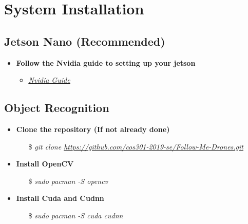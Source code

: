 \chapter{System Installation}

\section{Jetson Nano (Recommended)}
\begin{itemize}
    \item \textbf{Follow the Nvidia guide to setting up your jetson}
        \begin{itemize}
            \item \href{https://developer.nvidia.com/embedded/learn/get-started-jetson-nano-devkit}{\textit{\underline{Nvidia Guide}}} \cite{NvidiaJetson}
        \end{itemize}
\end{itemize}

\section{Object Recognition}
\begin{itemize}
    \item \textbf{Clone the repository (If not already done)}
        \begin{itemize}
            \item[\$] \textit{git clone \url{https://github.com/cos301-2019-se/Follow-Me-Drones.git}}
        \end{itemize}
    \item \textbf{Install OpenCV}
        \begin{itemize}
            \item[\$] \textit{sudo pacman -S opencv}
        \end{itemize}
    \item \textbf{Install Cuda and Cudnn}
        \begin{itemize}
            \item[\$] \textit{sudo pacman -S cuda cudnn}
        \end{itemize}
\end{itemize}


